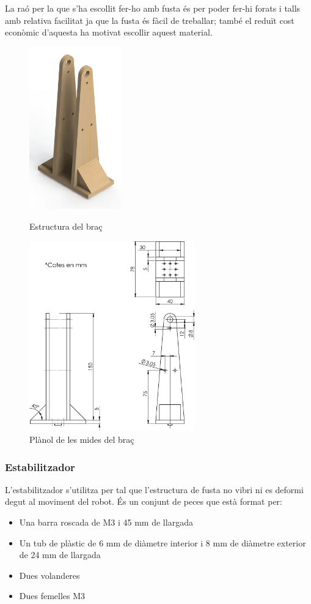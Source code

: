 \documentclass[a4paper, 12pt]{article}
\begin{document}
La raó per la que s'ha escollit fer-ho amb fusta és per poder fer-hi forats i talls amb relativa facilitat ja que la fusta és fàcil de treballar; també el reduït cost econòmic d'aquesta ha motivat escollir aquest material.
\begin{figure}[h!]
\begin{minipage}[b]{.45\linewidth}
\centering
\includegraphics[height=7cm]{./imgComp/estructura}
\caption{Estructura del braç}
\end{minipage}
\begin{minipage}[b]{.45\linewidth}
\centering
\includegraphics[height=8.2cm]{./sketch/estructura}
\caption{Plànol de les mides del braç}
\end{minipage}
\end{figure}

\subsubsection{Estabilitzador}
L'estabilitzador s'utilitza per tal que l'estructura de fusta no vibri ni es deformi degut al moviment del robot. 
És un conjunt de peces que està format per:
\begin{itemize}
\item Una barra roscada de M3 i 45 mm de llargada

\item Un tub de plàstic de 6 mm de diàmetre interior i 8 mm de diàmetre exterior de 24 mm de llargada

\item Dues volanderes

\item Dues femelles M3
\end{itemize}
\end{document}
